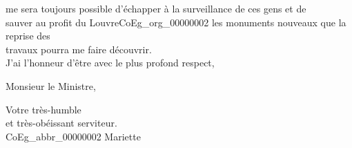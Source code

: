 \documentclass{book}
\begin{document}
me sera toujours possible d’échapper à la surveillance de ces gens et de\\
sauver au profit du Louvre\gls{CoEg_org_00000002} les monuments nouveaux que la reprise des\\
travaux pourra me faire découvrir.\\
\indent J’ai l’honneur d’être avec le plus profond respect,
\begin{center}Monsieur le Ministre,\end{center}
\begin{center}\hspace{5cm}Votre très-humble\\
\hspace{5cm}et très-obéissant serviteur.\\
\hspace{5cm}\gls{CoEg_abbr_00000002} Mariette\end{center}
\end{document}
